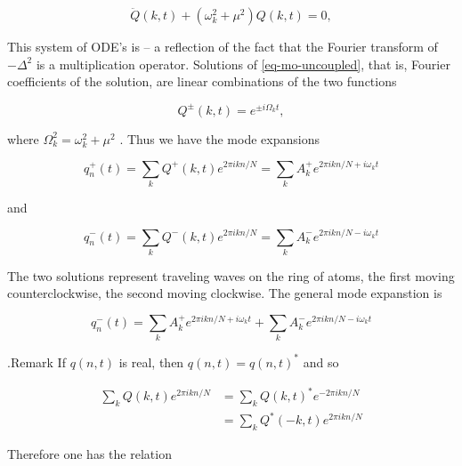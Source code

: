 \begin{equation}
\label{eq-mo-uncoupled}
\ddot Q(k,t) +  (\omega_k^2 + \mu^2) Q(k,t) = 0,
\end{equation}


This  system  of  ODE's  is    --  a  reflection  of  the  fact  that  the  Fourier  transform  of   $-\Delta^2$  is  a  multiplication  operator.   Solutions  of   \eqref{eq-mo-uncoupled},  that  is,  Fourier  coefficients  of  the  solution,  are  linear  combinations  of  the  two  functions



\begin{equation}
Q^\pm(k,t) = e^{\pm i\Omega_kt},
\end{equation}


where   $\Omega_k^2 = \omega_k^2 + \mu^2$ .   Thus  we  have  the  mode  expansions



\begin{equation}
q_n^+ (t) =  \sum_k Q^+ (k,t) e^{2\pi i kn/N}  
= \sum_k A_k^+ e^{2\pi i kn/N + i\omega_k t }
\end{equation}


and



\begin{equation}
q_n^-(t) =  \sum_k Q^- (k,t) e^{2\pi i kn/N}  =
 \sum_k A_k^- e^{2\pi i kn/N - i\omega_k t }
\end{equation}


The  two  solutions  represent  traveling  waves  on  the  ring  of  atoms,  the  first  moving  counterclockwise,  the  second  moving  clockwise.   The  general  mode  expanstion  is



\begin{equation}
q_n^-(t)   =
 \sum_k A_k^+ e^{2\pi i kn/N + i\omega_k t }
 + \sum_k A_k^- e^{2\pi i kn/N - i\omega_k t }
\end{equation}


.Remark
 If   $q(n,t)$  is  real,  then   $q(n,t) =q(n,t)^*$  and  so



\begin{align}
\sum_k Q(k,t) e^{2\pi i kn/N } &=  \sum_k  Q(k,t)^* e^{-2\pi i kn/N } \\
 &=  \sum_k Q^*(-k, t) e^{2\pi i kn/N }
\end{align}


Therefore  one  has  the  relation



